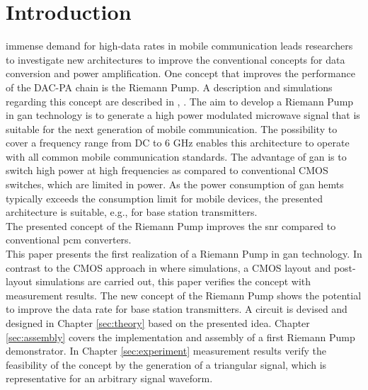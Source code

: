 \documentclass[journal]{IEEEtran}
\begin{document}
\section{Introduction}
\label{sec:introduction}
 immense demand for high-data rates in mobile communication leads researchers to investigate new architectures to improve the conventional concepts
for data conversion and power amplification.
One concept that improves the performance of the DAC-PA chain is the Riemann Pump.
A description and simulations regarding this concept are described in \cite{VeyracRivetDevalEtAl2014}, \cite{DevalRivetVeyrac2015}.
The aim to develop a Riemann Pump in \gls{gan} technology is to generate a high power modulated microwave signal that is suitable for the next generation of mobile communication.
The possibility to cover a frequency range from DC to 6 GHz enables this architecture to operate with all common mobile communication standards.
The advantage of \gls{gan} is to switch high power at high frequencies as compared to conventional CMOS switches, which are limited in power.
As the power consumption of \gls{gan} \glspl{hemt} typically exceeds the consumption limit for mobile devices, the presented architecture is suitable, e.g., for base station transmitters.\\
The presented concept of the Riemann Pump improves the \gls{snr} compared to conventional \gls{pcm} converters.
\\
This paper presents the first realization of a Riemann Pump in \gls{gan} technology.
In contrast to the CMOS approach in \cite{VeyracRivetDevalEtAl2016} where simulations, a CMOS layout and post-layout simulations are carried out, this paper verifies the concept with measurement results.
The new concept of the Riemann Pump shows the potential to improve the data rate for base station transmitters.
A circuit is devised and designed in Chapter \ref{sec:theory} based on the presented idea.
Chapter \ref{sec:assembly} covers the implementation and assembly of a first Riemann Pump demonstrator.
In Chapter \ref{sec:experiment} measurement results verify the feasibility of the concept by the generation of a triangular signal, which is representative for an arbitrary signal waveform.
\end{document}
